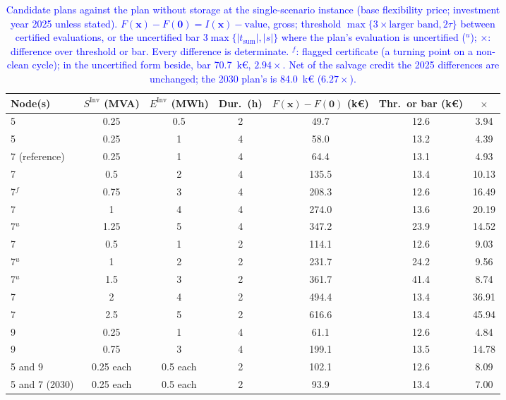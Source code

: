 \begin{table}[htbp!]
    \centering
    \caption{\textcolor{blue}{Candidate plans against the plan without storage at the single-scenario instance (base flexibility price; investment year 2025 unless stated). $F(\boldsymbol{x}) - F(\boldsymbol{0}) = I(\boldsymbol{x}) - \text{value}$, gross; threshold $\max\{3 \times \text{larger band}, 2\tau\}$ between certified evaluations, or the uncertified bar $3 \max\{|t_{\text{sum}}|, |s|\}$ where the plan's evaluation is uncertified ($^{u}$); $\times$: difference over threshold or bar. Every difference is determinate. $^{f}$: flagged certificate (a turning point on a non-clean cycle); in the uncertified form beside, bar 70.7~k\euro, $2.94\times$. Net of the salvage credit the 2025 differences are unchanged; the 2030 plan's is 84.0~k\euro{} ($6.27\times$).}}
    \label{tab:res_value_ladder}
    \scriptsize\setlength{\tabcolsep}{3pt}
    \begin{tabular}{l c c c c c c}
        \toprule
        Node(s) & $S^{\text{Inv}}$ (MVA) & $E^{\text{Inv}}$ (MWh) & Dur.\ (h) & $F(\boldsymbol{x}) - F(\boldsymbol{0})$ (k\euro) & Thr.\ or bar (k\euro) & $\times$ \\
        \midrule
        5                 & 0.25 & 0.5 & 2 & 49.7  & 12.6 & 3.94  \\
        5                 & 0.25 & 1   & 4 & 58.0  & 13.2 & 4.39  \\
        7 (reference)     & 0.25 & 1   & 4 & 64.4  & 13.1 & 4.93  \\
        7                 & 0.5  & 2   & 4 & 135.5 & 13.4 & 10.13 \\
        7$^{f}$           & 0.75 & 3   & 4 & 208.3 & 12.6 & 16.49 \\
        7                 & 1    & 4   & 4 & 274.0 & 13.6 & 20.19 \\
        7$^{u}$           & 1.25 & 5   & 4 & 347.2 & 23.9 & 14.52 \\
        7                 & 0.5  & 1   & 2 & 114.1 & 12.6 & 9.03  \\
        7$^{u}$           & 1    & 2   & 2 & 231.7 & 24.2 & 9.56  \\
        7$^{u}$           & 1.5  & 3   & 2 & 361.7 & 41.4 & 8.74  \\
        7                 & 2    & 4   & 2 & 494.4 & 13.4 & 36.91 \\
        7                 & 2.5  & 5   & 2 & 616.6 & 13.4 & 45.94 \\
        9                 & 0.25 & 1   & 4 & 61.1  & 12.6 & 4.84  \\
        9                 & 0.75 & 3   & 4 & 199.1 & 13.5 & 14.78 \\
        5 and 9           & 0.25 each & 0.5 each & 2 & 102.1 & 12.6 & 8.09 \\
        5 and 7 (2030)    & 0.25 each & 0.5 each & 2 & 93.9  & 13.4 & 7.00 \\
        \bottomrule
    \end{tabular}
\end{table}

